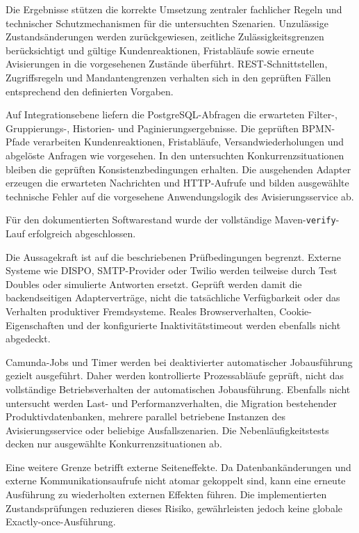 \documentclass[
  12pt,
  a4paper,
  oneside
]{article}
\begin{document}
Die Ergebnisse stützen die korrekte Umsetzung zentraler fachlicher Regeln und
technischer Schutzmechanismen für die untersuchten Szenarien. Unzulässige
Zustandsänderungen werden zurückgewiesen, zeitliche Zulässigkeitsgrenzen
berücksichtigt und gültige Kundenreaktionen, Fristabläufe sowie erneute
Avisierungen in die vorgesehenen Zustände überführt. REST-Schnittstellen,
Zugriffsregeln und Mandantengrenzen verhalten sich in den geprüften Fällen
entsprechend den definierten Vorgaben.

Auf Integrationsebene liefern die PostgreSQL-Abfragen die erwarteten Filter-,
Gruppierungs-, Historien- und Paginierungsergebnisse. Die geprüften BPMN-Pfade
verarbeiten Kundenreaktionen, Fristabläufe, Versandwiederholungen und abgelöste
Anfragen wie vorgesehen. In den untersuchten Konkurrenzsituationen bleiben die
geprüften Konsistenzbedingungen erhalten. Die ausgehenden Adapter erzeugen die
erwarteten Nachrichten und HTTP-Aufrufe und bilden ausgewählte technische Fehler
auf die vorgesehene Anwendungslogik des Avisierungsservice ab.

Für den dokumentierten Softwarestand wurde der vollständige
Maven-\texttt{verify}-Lauf erfolgreich abgeschlossen.

Die Aussagekraft ist auf die beschriebenen Prüfbedingungen begrenzt. Externe
Systeme wie DISPO, SMTP-Provider oder Twilio werden teilweise durch Test Doubles
oder simulierte Antworten ersetzt. Geprüft werden damit die backendseitigen
Adapterverträge, nicht die tatsächliche Verfügbarkeit oder das Verhalten
produktiver Fremdsysteme. Reales Browserverhalten, Cookie-Eigenschaften und der
konfigurierte Inaktivitätstimeout werden ebenfalls nicht abgedeckt.

Camunda-Jobs und Timer werden bei deaktivierter automatischer Jobausführung
gezielt ausgeführt. Daher werden kontrollierte Prozessabläufe geprüft, nicht das
vollständige Betriebsverhalten der automatischen Jobausführung. Ebenfalls nicht
untersucht werden Last- und Performanzverhalten, die Migration bestehender
Produktivdatenbanken, mehrere parallel betriebene Instanzen des
Avisierungsservice oder beliebige Ausfallszenarien. Die Nebenläufigkeitstests
decken nur ausgewählte Konkurrenzsituationen ab.

Eine weitere Grenze betrifft externe Seiteneffekte. Da Datenbankänderungen und
externe Kommunikationsaufrufe nicht atomar gekoppelt sind, kann eine erneute
Ausführung zu wiederholten externen Effekten führen. Die implementierten
Zustandsprüfungen reduzieren dieses Risiko, gewährleisten jedoch keine globale
Exactly-once-Ausführung.
\end{document}
